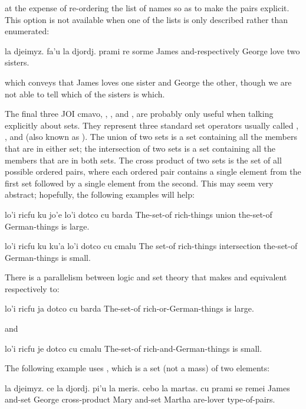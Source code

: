{\noindent}at the expense of re-ordering the list of names so as to make
    the pairs explicit. This option is not available when one of
    the lists is only described rather than enumerated:
\begin{example}
la djeimyz. fa'u la djordj. prami re sorme\n
James and-respectively George love two sisters.
\end{example}

{\noindent}which conveys that James loves one sister and George the other,
    though we are not able to tell which of the sisters is which.



The final three JOI cmavo, , , and ,
    are probably only useful when talking explicitly about sets.
    They represent three standard set operators usually called
    , , and  (also known
    as ). The union of two sets is a set
    containing all the members that are in either set; the
    intersection of two sets is a set containing all the members
    that are in both sets. The cross product of two sets is the set
    of all possible ordered pairs, where each ordered pair contains
    a single element from the first set followed by a single
    element from the second. This may seem very abstract;
    hopefully, the following examples will help:
\begin{example}
lo'i ricfu ku jo'e lo'i dotco\n
\T	cu barda\n
The-set-of rich-things union the-set-of German-things\n
\T	is large.
\end{example}

\begin{example}
lo'i ricfu ku ku'a\n
\T	lo'i dotco cu cmalu\n
The set-of rich-things intersection\n
\T	the-set-of German-things is small.
\end{example}

There is a parallelism between logic and set theory that makes and  equivalent respectively to:
\begin{example}
lo'i ricfu ja dotco cu barda\n
The-set-of rich-or-German-things is large.
\end{example}

{\noindent}and
\begin{example}
lo'i ricfu je dotco cu cmalu\n
The-set-of rich-and-German-things is small.
\end{example}

The following example uses , which is a set (not
    a mass) of two elements:
\begin{example}
la djeimyz. ce la djordj.\n
\T	pi'u la meris. cebo la martas.\n
\T	cu prami se remei\n
James and-set George\n
\T	cross-product Mary and-set Martha\n
\T	are-lover type-of-pairs.
\end{example}

